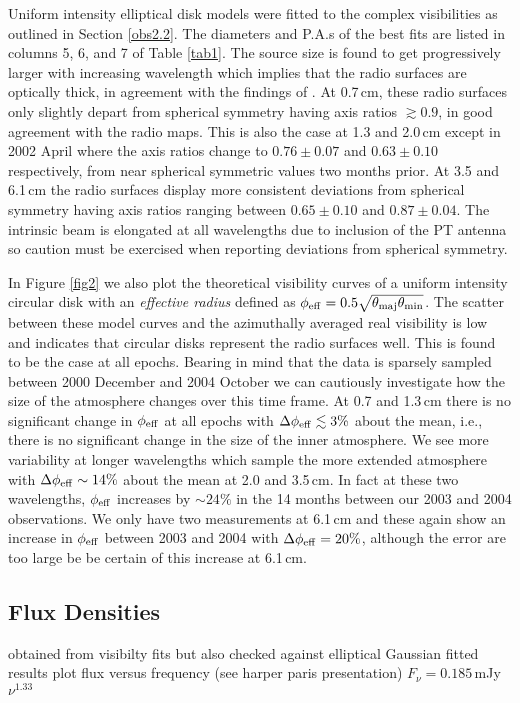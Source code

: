 \documentclass[iop]{emulateapj}
\begin{document}
Uniform intensity elliptical disk models were fitted to the complex visibilities as outlined in Section \ref{obs2.2}. The diameters and P.A.s of the best fits are listed in columns 5, 6, and 7 of Table \ref{tab1}. The source size is found to get progressively larger with increasing wavelength which implies that the radio surfaces are optically thick, in agreement with the findings of \cite{lim_1998}. At 0.7\,cm, these radio surfaces only slightly depart from spherical symmetry having axis ratios $\gtrsim 0.9$, in good agreement with the radio maps. This is also the case at 1.3 and 2.0\,cm except in 2002 April where the axis ratios change to $0.76\pm 0.07$ and $0.63\pm 0.10$ respectively, from near spherical symmetric values two months prior. At 3.5 and 6.1\,cm the radio surfaces display more consistent deviations from spherical symmetry having axis ratios ranging between $0.65\pm 0.10$ and $0.87\pm 0.04$. The intrinsic beam is elongated at all wavelengths due to inclusion of the PT antenna so caution must be exercised when reporting deviations from spherical symmetry. 

In Figure \ref{fig2} we also plot the theoretical visibility curves of a uniform intensity circular disk with an \textit{effective radius} defined as $\phi _{\rm{eff}}=0.5\sqrt{\theta _{\rm{maj}}\theta _{\rm{min}}}$. The scatter between these model curves and the azimuthally averaged real visibility is low and indicates that circular disks represent the radio surfaces well. This is found to be the case at all epochs. Bearing in mind that the data is sparsely sampled between 2000 December and 2004 October we can cautiously investigate how the size of the atmosphere changes over this time frame. At 0.7 and 1.3\,cm there is no significant change in $\phi _{\rm{eff}}$ at all epochs with $\Delta \phi _{\rm{eff}} \lesssim 3\%$ about the mean, i.e., there is no significant change in the size of the inner atmosphere. We see more variability at longer wavelengths which sample the more extended atmosphere with $\Delta \phi _{\rm{eff}} \sim 14\%$ about the mean at 2.0 and 3.5\,cm. In fact at these two wavelengths, $\phi _{\rm{eff}}$ increases by $\sim 24\%$ in the 14 months between our 2003 and 2004 observations. We only have two measurements at 6.1\,cm and these again show an increase in $\phi _{\rm{eff}}$ between 2003 and 2004 with $\Delta \phi _{\rm{eff}} =20\%$, although the error are too large be be certain of this increase at 6.1\,cm.

\subsection{Flux Densities}
obtained from visibilty fits but also checked against elliptical Gaussian fitted results
plot flux versus frequency (see harper paris presentation)
$F_{\nu} = 0.185$\,mJy\,$\nu ^{1.33}$
\end{document}
